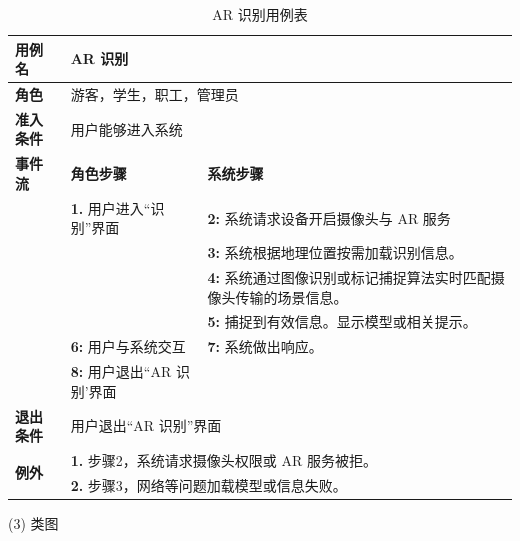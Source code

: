 \begin{table}[H]
  \centering
  \renewcommand\arraystretch{1.1}
  \small
  \caption{AR 识别用例表}
  \setlength{\tabcolsep}{4mm}
  \begin{tabular}{|p{2cm}|p{5.75cm}|p{5.75cm}|}
    \hline \textbf{用例名} & \multicolumn{2}{l|}{AR 识别} \\
    \hline \textbf{角色} & \multicolumn{2}{l|}{游客，学生，职工，管理员} \\
    \hline \textbf{准入条件} & \multicolumn{2}{l|}{用户能够进入系统} \\
    \hline \textbf{事件流} & \textbf{角色步骤} & \textbf{系统步骤} \\
    \hline \multirow{3}{*}{~} & \textbf{1.} 用户进入``识别''界面  & \textbf{2:} 系统请求设备开启摄像头与 AR 服务   \\
    \cline{2-3} &  & \textbf{3:} 系统根据地理位置按需加载识别信息。\\
    \cline{2-3} &  & \textbf{4:} 系统通过图像识别或标记捕捉算法实时匹配摄像头传输的场景信息。 \\
    \cline{2-3} &  & \textbf{5:} 捕捉到有效信息。显示模型或相关提示。 \\
    \cline{2-3} & \textbf{6:} 用户与系统交互 & \textbf{7:} 系统做出响应。 \\
    \cline{2-3} & \textbf{8:} 用户退出``AR 识别'界面  &  \\
    \hline \textbf{退出条件}  & \multicolumn{2}{l|}{用户退出``AR 识别''界面} \\
    \hline \multirow{2}{*}{\textbf{例外}} & \multicolumn{2}{l|}{\textbf{1.} 步骤2，系统请求摄像头权限或 AR 服务被拒。} \\
    & \multicolumn{2}{l|}{\textbf{2.} 步骤3，网络等问题加载模型或信息失败。} \\
    \hline
  \end{tabular}
\end{table}

(3) 类图